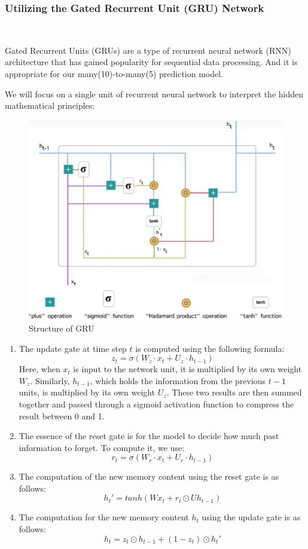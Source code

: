 \subsubsection{Utilizing the Gated Recurrent Unit (GRU) Network}~{}

Gated Recurrent Units (GRUs) are a type of recurrent neural network (RNN) 
architecture that has gained popularity for sequential data processing. 
And it is appropriate for our many(10)-to-many(5) prediction model.

We will focus on a single unit of recurrent neural network to interpret the hidden mathematical principles:
\begin{figure}[H]
    \centering
    \includegraphics[scale=0.15]{mainmatter/imgs/6.jpg}
    \caption{Structure of GRU}
\end{figure}

\begin{enumerate}
    \item 
    The update gate at time step $t$ is computed using the following formula:  
    $$  z_t = \sigma(W_z \cdot x_t + U_z \cdot h_{t-1})  $$  
    Here, when $x_t$ is input to the network unit, 
    it is multiplied by its own weight $W_z$. 
    Similarly, $h_{t-1}$, which holds the information from the previous $t-1$ units, 
    is multiplied by its own weight $U_z$. These two results are then summed together 
    and passed through a sigmoid activation function to compress the result between 0 and 1. 
  
    \item 
    The essence of the reset gate is for the model to decide how much past information to forget. To compute it, we use:  
    $$  r_t = \sigma(W_r \cdot x_t + U_r \cdot h_{t-1})  $$  

    \item 
    The computation of the new memory content using the reset gate is as follows:  
    $$ h_t'= tanh(Wx_t+r_t\odot Uh_{t-1})$$

    \item 
    The computation for the new memory content $h_t$ using the update gate is as follows:  
    $$ h_t=z_t\odot h_{t-1}+(1-z_t)\odot h_t'$$ 
\end{enumerate}

